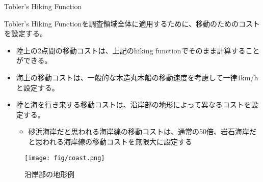 \documentclass[xelatex, 8pt]{beamer}
\theoremstyle{plain}
\theoremstyle{definition}
\begin{document}
\begin{frame}{Tobler's Hiking Function}

Tobler's Hiking Functionを調査領域全体に適用するために、移動のためのコストを設定する。

\begin{itemize}
    \item 陸上の2点間の移動コストは、上記のhiking functionでそのまま計算することができる。
    \item 海上の移動コストは、一般的な木造丸木船の移動速度を考慮して一律4km/hと設定する。
    \item 陸と海を行き来する移動コストは、沿岸部の地形によって異なるコストを設定する。
        \begin{itemize}
            \item 砂浜海岸だと思われる海岸線の移動コストは、通常の50倍、岩石海岸だと思われる海岸線の移動コストを無限大に設定する
        \end{itemize}
\end{itemize}
\begin{figure}\centering\texttt{[image: fig/coast.png]}\caption{沿岸部の地形例}
\end{figure}

\end{frame}
\end{document}
